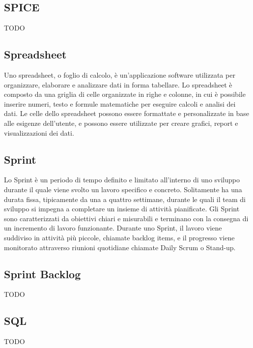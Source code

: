 \vspace{2em}
\subsection*{SPICE}
TODO

\vspace{2em}
\subsection*{Spreadsheet}
Uno spreadsheet, o foglio di calcolo, è un'applicazione software utilizzata per organizzare, elaborare e analizzare dati in forma tabellare. Lo spreadsheet è composto da una griglia di celle organizzate in righe e colonne, in cui è possibile inserire numeri, testo e formule matematiche per eseguire calcoli e analisi dei dati. Le celle dello spreadsheet possono essere formattate e personalizzate in base alle esigenze dell'utente, e possono essere utilizzate per creare grafici, report e visualizzazioni dei dati.

\vspace{2em}
\subsection*{Sprint}
Lo Sprint è un periodo di tempo definito e limitato all'interno di uno sviluppo  durante il quale viene svolto un lavoro specifico e concreto. Solitamente ha una durata fissa, tipicamente da una a quattro settimane, durante le quali il team di sviluppo si impegna a completare un insieme di attività pianificate. Gli Sprint sono caratterizzati da obiettivi chiari e misurabili e terminano con la consegna di un incremento di lavoro funzionante. Durante uno Sprint, il lavoro viene suddiviso in attività più piccole, chiamate backlog items, e il progresso viene monitorato attraverso riunioni quotidiane chiamate Daily Scrum o Stand-up.

\vspace{2em}
\subsection*{Sprint Backlog}
TODO

\vspace{2em}
\subsection*{SQL}
TODO

\vspace{2em}
